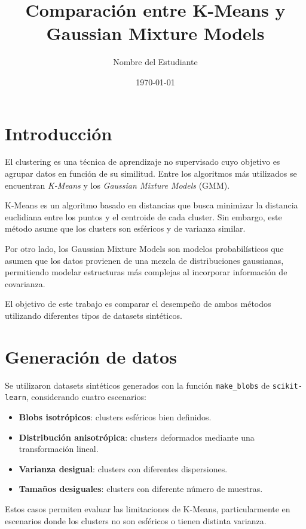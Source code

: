 \documentclass[12pt]{article}
\title{Comparación entre K-Means y Gaussian Mixture Models}
\author{Nombre del Estudiante}
\date{\today}
\begin{document}
\maketitle

\section{Introducción}

El clustering es una técnica de aprendizaje no supervisado cuyo objetivo es agrupar datos en función de su similitud. Entre los algoritmos más utilizados se encuentran \textit{K-Means} y los \textit{Gaussian Mixture Models} (GMM).

K-Means es un algoritmo basado en distancias que busca minimizar la distancia euclidiana entre los puntos y el centroide de cada cluster. Sin embargo, este método asume que los clusters son esféricos y de varianza similar.

Por otro lado, los Gaussian Mixture Models son modelos probabilísticos que asumen que los datos provienen de una mezcla de distribuciones gaussianas, permitiendo modelar estructuras más complejas al incorporar información de covarianza.

El objetivo de este trabajo es comparar el desempeño de ambos métodos utilizando diferentes tipos de datasets sintéticos.

\section{Generación de datos}

Se utilizaron datasets sintéticos generados con la función \texttt{make\_blobs} de \texttt{scikit-learn}, considerando cuatro escenarios:

\begin{itemize}
    \item \textbf{Blobs isotrópicos}: clusters esféricos bien definidos.
    \item \textbf{Distribución anisotrópica}: clusters deformados mediante una transformación lineal.
    \item \textbf{Varianza desigual}: clusters con diferentes dispersiones.
    \item \textbf{Tamaños desiguales}: clusters con diferente número de muestras.
\end{itemize}

Estos casos permiten evaluar las limitaciones de K-Means, particularmente en escenarios donde los clusters no son esféricos o tienen distinta varianza.
\end{document}
